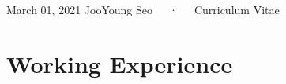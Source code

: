 \documentclass[11pt, a4paper]{awesome-cv}
\begin{document}
\makecvheader

\makecvfooter
  {March 01, 2021}
    {JooYoung Seo~~~·~~~Curriculum Vitae}
  {\thepage}





\hypertarget{working-experience}{%
\section{Working Experience}\label{working-experience}}
\end{document}
